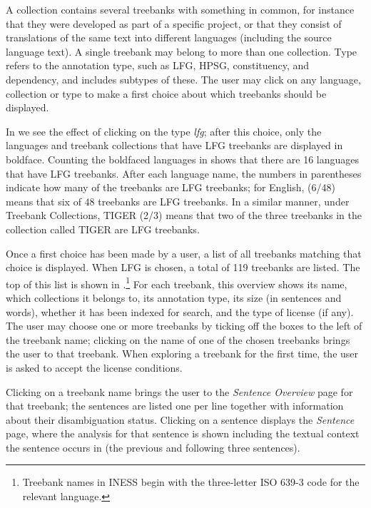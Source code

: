 \documentclass[output=paper,hidelinks]{langscibook}
\begin{document}
A collection contains several treebanks with something in common, for instance that they were developed as part of a specific project, or that they consist of translations of the same text into different languages (including the source language text).
A single treebank may belong to more than one collection.
Type refers to the annotation type, such as LFG, HPSG, constituency, and dependency, and includes subtypes of these.
The user may click on any language, collection or type to make a first choice about which treebanks should be displayed.

In  we see the effect of clicking on the type \textit{lfg}; after this choice, only the languages and treebank collections that have LFG treebanks are displayed in boldface.
Counting the boldfaced languages in  shows that there are 16 languages that have LFG treebanks.
After each language name, the numbers in parentheses indicate how many of the treebanks are LFG treebanks; for English, (6/48) means that six of 48 treebanks are LFG treebanks.
In a similar manner, under Treebank Collections, TIGER (2/3) means that two of the three treebanks in the collection called TIGER are LFG treebanks. %

Once a first choice has been made by a user, a list of all treebanks matching that choice is displayed.
When LFG is chosen, a total of 119 treebanks are listed.
The top of this list is shown in .\footnote{
Treebank names in INESS begin with the three-letter ISO 639-3 code for the relevant language.}
For each treebank, this overview shows its name, which collections it belongs to, its annotation type, its size (in sentences and words), whether it has been indexed for search, and the type of license (if any).
The user may choose one or more treebanks by ticking off the boxes to the left of the treebank name; 
clicking on the name of one of the chosen treebanks brings the user to that treebank.
When exploring a treebank for the first time, the user is asked to accept the license conditions.

Clicking on a treebank name brings the user to the \emph{Sentence Overview} page for that treebank; the sentences are listed one per line together with information about their disambiguation status.
Clicking on a sentence displays the \emph{Sentence} page, where the analysis for that sentence is shown including the textual context the sentence occurs in (the previous and following three sentences).
\end{document}
